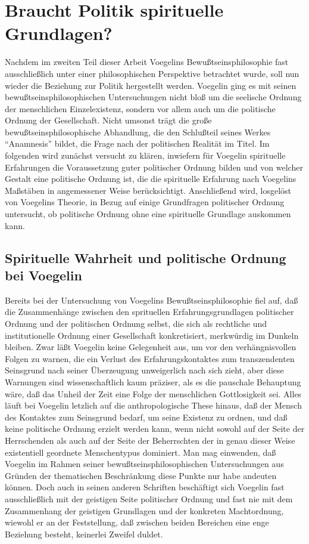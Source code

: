 \chapter{Braucht Politik spirituelle Grundlagen?}

Nachdem im zweiten Teil dieser Arbeit Voegelins Bewußtseinsphilosophie fast
ausschließlich unter einer philosophischen Perspektive betrachtet wurde, soll
nun wieder die Beziehung zur Politik hergestellt werden. Voegelin ging es mit
seinen bewußtseinsphilosophischen Untersuchungen nicht bloß um die seelische
Ordnung der menschlichen Einzelexistenz, sondern vor allem auch um die
politische Ordnung der Gesellschaft. Nicht umsonst trägt die große
bewußtseinsphilosophische Abhandlung, die den Schlußteil seines Werkes
"`Anamnesis"' bildet, die Frage nach der politischen Realität im Titel. Im
folgenden wird zunächst versucht zu klären, inwiefern für Voegelin spirituelle
Erfahrungen die Voraussetzung guter politischer Ordnung bilden und von
welcher Gestalt eine politische Ordnung ist, die die spirituelle Erfahrung
nach Voegelins Maßstäben in angemessener Weise berücksichtigt. Anschließend
wird, losgelöst von Voegelins Theorie, in Bezug auf einige Grundfragen
politischer Ordnung untersucht, ob politische Ordnung ohne eine spirituelle
Grundlage auskommen kann. 

\section{Spirituelle Wahrheit und politische Ordnung bei Voegelin}

Bereits bei der Untersuchung von Voegelins Bewußtseinsphilosophie fiel auf,
daß die Zusammenhänge zwischen den sprituellen Erfahrungsgrundlagen
politischer Ordnung und der politischen Ordnung selbst, die sich als
rechtliche und institutionelle Ordnung einer Gesellschaft konkretisiert,
merkwürdig im Dunkeln bleiben. Zwar läßt Voegelin keine Gelegenheit aus, um
vor den verhängnisvollen Folgen zu warnen, die ein Verlust des
Erfahrungskontaktes zum transzendenten Seinsgrund nach seiner Überzeugung
unweigerlich nach sich zieht, aber diese Warnungen sind wissenschaftlich kaum
präziser, als es die pauschale Behauptung wäre, daß das Unheil der Zeit eine
Folge der menschlichen Gottlosigkeit sei. Alles läuft bei Voegelin letzlich
auf die anthropologische These hinaus, daß der Mensch des Kontaktes zum
Seinsgrund bedarf, um seine Existenz zu ordnen, und daß keine politische
Ordnung erzielt werden kann, wenn nicht sowohl auf der Seite der Herrschenden
als auch auf der Seite der Beherrschten der in genau dieser Weise existentiell
geordnete Menschentypus dominiert. Man mag einwenden, daß Voegelin im Rahmen
seiner bewußtseinsphilosophischen Untersuchungen aus Gründen der thematischen
Beschränkung diese Punkte nur habe andeuten können. Doch auch in seinen
anderen Schriften beschäftigt sich Voegelin fast ausschließlich mit der
geistigen Seite politischer Ordnung und fast nie mit dem Zusammenhang der
geistigen Grundlagen und der konkreten Machtordnung, wiewohl er an der
Feststellung, daß zwischen beiden Bereichen eine enge Beziehung besteht,
keinerlei Zweifel duldet.

